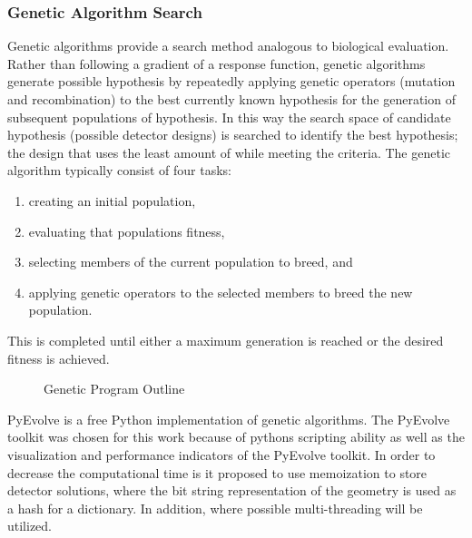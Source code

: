 \subsubsection{Genetic Algorithm Search}
\label{sec:GeneticAlgoSearchMethod}
Genetic algorithms provide a search method analogous to biological evaluation. 
Rather than following a gradient of a response function, genetic algorithms generate possible hypothesis by repeatedly applying genetic operators (mutation and recombination) to the best currently known hypothesis for the generation of subsequent populations of hypothesis. 
In this way the search space of candidate hypothesis (possible detector designs) is searched to identify the best hypothesis; the design that uses the least amount of  while meeting the criteria. 
The genetic algorithm typically consist of four tasks: 
\begin{enumerate}
  \item creating an initial population, 
  \item evaluating that populations fitness, 
  \item selecting members of the current population to breed, and 
  \item applying genetic operators to the selected members to breed the new population. 
\end{enumerate}	
This is completed until either a maximum generation is reached or the desired fitness is achieved.
\begin{figure}
\begin{algorithmic}
		\ENDFOR
		\ENDFOR
	\ENDWHILE
\end{algorithmic}
\caption{Genetic Program Outline}
\label{AlgoOutline}
\end{figure}

PyEvolve is a free Python implementation of genetic algorithms.
The PyEvolve toolkit was chosen for this work because of pythons scripting ability as well as the visualization and performance indicators of the PyEvolve toolkit.
In order to decrease the computational time is it proposed to use memoization to store detector solutions, where the bit string representation of the geometry is used as a hash for a dictionary.  
In addition, where possible multi-threading will be utilized.


